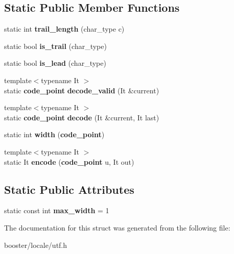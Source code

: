 \subsection*{Static Public Member Functions}
\begin{DoxyCompactItemize}
\item 
static int {\bfseries trail\+\_\+length} (char\+\_\+type c)\label{structbooster_1_1locale_1_1utf_1_1utf__traits_3_01CharType_00_014_01_4_a7495d5f1a40d322c3aa31538e8ac8ed9}

\item 
static bool {\bfseries is\+\_\+trail} (char\+\_\+type)\label{structbooster_1_1locale_1_1utf_1_1utf__traits_3_01CharType_00_014_01_4_a45e91c957414c7db0ddc55b4dee72861}

\item 
static bool {\bfseries is\+\_\+lead} (char\+\_\+type)\label{structbooster_1_1locale_1_1utf_1_1utf__traits_3_01CharType_00_014_01_4_a4cebda25077792ef3301af64a7c59ef1}

\item 
{\footnotesize template$<$typename It $>$ }\\static {\bf code\+\_\+point} {\bfseries decode\+\_\+valid} (It \&current)\label{structbooster_1_1locale_1_1utf_1_1utf__traits_3_01CharType_00_014_01_4_acf7afcb5bf50b0ed0194588da2939e97}

\item 
{\footnotesize template$<$typename It $>$ }\\static {\bf code\+\_\+point} {\bfseries decode} (It \&current, It last)\label{structbooster_1_1locale_1_1utf_1_1utf__traits_3_01CharType_00_014_01_4_a5937c23b67318efa7a5950b0f549e755}

\item 
static int {\bfseries width} ({\bf code\+\_\+point})\label{structbooster_1_1locale_1_1utf_1_1utf__traits_3_01CharType_00_014_01_4_a3f89516cc122545d14c953c824f937f5}

\item 
{\footnotesize template$<$typename It $>$ }\\static It {\bfseries encode} ({\bf code\+\_\+point} u, It out)\label{structbooster_1_1locale_1_1utf_1_1utf__traits_3_01CharType_00_014_01_4_a82f9614fe82f33ca1829c410d8a7f5d5}

\end{DoxyCompactItemize}
\subsection*{Static Public Attributes}
\begin{DoxyCompactItemize}
\item 
static const int {\bfseries max\+\_\+width} = 1\label{structbooster_1_1locale_1_1utf_1_1utf__traits_3_01CharType_00_014_01_4_aebcb701e76251c9a913929ac2682fba9}

\end{DoxyCompactItemize}


The documentation for this struct was generated from the following file\+:\begin{DoxyCompactItemize}
\item 
booster/locale/utf.\+h\end{DoxyCompactItemize}
